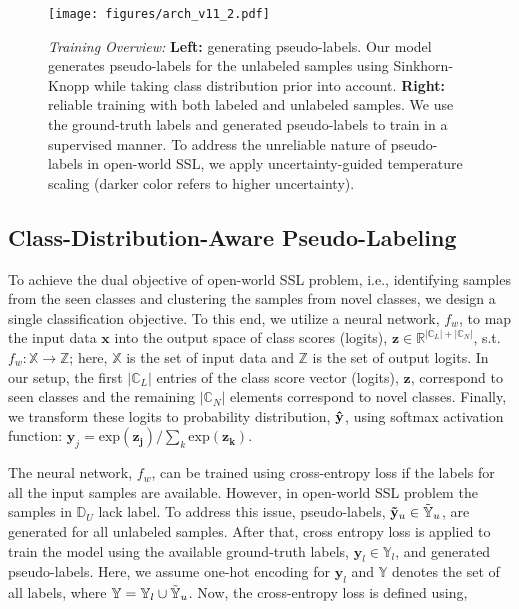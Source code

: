 \documentclass[runningheads]{eccv2022submission}
\begin{document}
\begin{figure*}[h]
\vspace{2mm}
\begin{center}
  \texttt{[image: figures/arch\_v11\_2.pdf]}
\end{center}
\vspace{-4mm}
\caption{\textit{Training Overview:} \textbf{Left:} generating pseudo-labels. Our model generates pseudo-labels for the unlabeled samples using Sinkhorn-Knopp while taking class distribution prior into account. \textbf{Right:} reliable training with both labeled and unlabeled samples. We use the ground-truth labels and generated pseudo-labels to train in a supervised manner. To address the unreliable nature of pseudo-labels in open-world SSL, we apply uncertainty-guided temperature scaling (darker color refers to higher uncertainty).}
\vspace{-6mm}

\label{fig:arch}
\end{figure*}

\subsection{Class-Distribution-Aware Pseudo-Labeling}
\label{sec:equi-pl}

To achieve the dual objective of open-world SSL problem, i.e., identifying samples from the seen classes and clustering the samples from novel classes, we design a single classification objective. To this end, we utilize a neural network, $f_w$, to map the input data $\mathbf{x}$ into the output space of class scores (logits), $\mathbf{{z}}\in \mathbb{R}^{|\mathbb{C}_L| + |\mathbb{C}_N|}$, s.t.\ $f_w: \mathbb{X} \rightarrow \mathbb{{Z}}$; here, $\mathbb{X}$ is the set of input data and $\mathbb{Z}$ is the set of output logits. In our setup, the first $|\mathbb{C}_L|$ entries of the class score vector (logits), $\mathbf{z}$, correspond to seen classes and the remaining $|\mathbb{C}_N|$ elements correspond to novel classes. Finally, we transform these logits to probability distribution, $\mathbf{\Hat{y}}$, using softmax activation function: $\mathbf{\hat{y}}_j = \mathrm{exp}(\mathbf{z_j})/\sum_k\mathrm{exp}(\mathbf{z_k})$.


The neural network, $f_w$, can be trained using cross-entropy loss if the labels for all the input samples are available. However, in open-world SSL problem the samples in $\mathbb{D}_U$ lack label. To address this issue, pseudo-labels, $\mathbf{\Tilde{y}}_u\in\mathbb{\Tilde{Y}}_u$, are generated for all unlabeled samples. After that, cross entropy loss is  applied to train the model using the available ground-truth labels, ${\mathbf{y}}_l\in{\mathbb{Y}}_l$, and generated pseudo-labels. Here, we assume one-hot encoding for ${\mathbf{y}}_l$ and ${\mathbb{Y}}$ denotes the set of all labels, where ${\mathbb{Y}} = \mathbb{Y}_l\cup \mathbb{\Tilde{Y}}_u$. Now, the cross-entropy loss is defined using,
\end{document}
